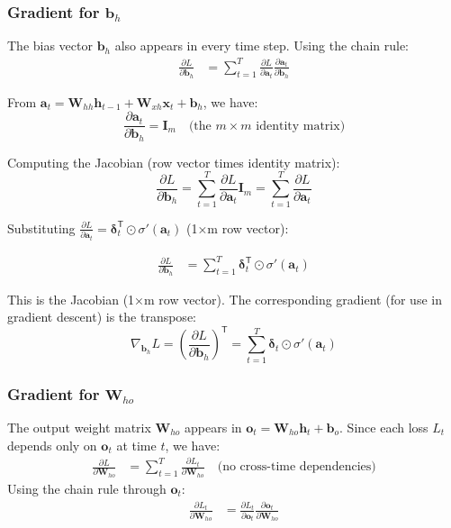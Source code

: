 \begin{notechapter}
\subsubsection{Gradient for $\mathbf{b}_h$}

The bias vector $\mathbf{b}_h$ also appears in every time step. Using the chain
rule:
%
\begin{align*}
    \frac{\partial L}{\partial \mathbf{b}_h} 
&= \sum_{t=1}^{T} \frac{\partial L}{\partial \mathbf{a}_t} \frac{\partial
\mathbf{a}_t}{\partial \mathbf{b}_h}
\end{align*}

From $\mathbf{a}_t = \mathbf{W}_{hh} \mathbf{h}_{t-1} + \mathbf{W}_{xh}
\mathbf{x}_t + \mathbf{b}_h$, we have:
\[
\frac{\partial \mathbf{a}_t}{\partial \mathbf{b}_h} = \mathbf{I}_m \quad 
\text{(the $m \times m$ identity matrix)}
\]

Computing the Jacobian (row vector times identity matrix):
\[
\frac{\partial L}{\partial \mathbf{b}_h} = \sum_{t=1}^{T} \frac{\partial 
L}{\partial \mathbf{a}_t} \mathbf{I}_m
= \sum_{t=1}^{T} \frac{\partial L}{\partial \mathbf{a}_t}
\]

Substituting $\frac{\partial L}{\partial \mathbf{a}_t} = \bm{\delta}_t^\mathsf{T} \odot 
\sigma'(\mathbf{a}_t)$ (1×m row vector):

\begin{align}
\frac{\partial L}{\partial \mathbf{b}_h} &= \sum_{t=1}^{T} \bm{\delta}_t^\mathsf{T} \odot
\sigma'(\mathbf{a}_t) \label{chain-rule-to-bptt:eq:dbh_detailed}
\end{align}

This is the Jacobian (1×m row vector). The corresponding gradient (for use in
gradient descent) is the transpose:
\[
\nabla_{\mathbf{b}_h} L = \left(\frac{\partial L}{\partial \mathbf{b}_h}\right)^\mathsf{T} 
= \sum_{t=1}^{T} \bm{\delta}_t \odot \sigma'(\mathbf{a}_t)
\]

\subsubsection{Gradient for $\mathbf{W}_{ho}$}

The output weight matrix $\mathbf{W}_{ho}$ appears in $\mathbf{o}_t =
\mathbf{W}_{ho} \mathbf{h}_t + \mathbf{b}_o$. Since each loss $L_t$ depends only
on $\mathbf{o}_t$ at time $t$, we have:
%
\begin{align*}
    \frac{\partial L}{\partial \mathbf{W}_{ho}} 
&= \sum_{t=1}^{T} \frac{\partial L_t}{\partial \mathbf{W}_{ho}} \quad \text{(no
cross-time dependencies)}
\end{align*}
%
Using the chain rule through $\mathbf{o}_t$:
\begin{align*}
    \frac{\partial L_t}{\partial \mathbf{W}_{ho}} 
&= \frac{\partial L_t}{\partial \mathbf{o}_t} \frac{\partial
\mathbf{o}_t}{\partial \mathbf{W}_{ho}}
\end{align*}


\end{notechapter}
